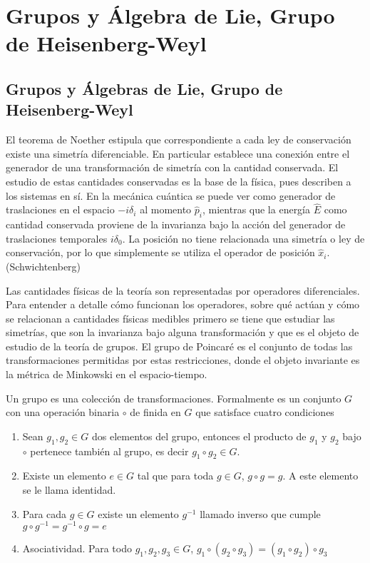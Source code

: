 \chapter{Grupos y \'Algebra de Lie, Grupo de Heisenberg-Weyl}
\section{Grupos y Álgebras de Lie, Grupo de Heisenberg-Weyl}

El teorema de Noether estipula que correspondiente a cada ley de conservación existe una simetría diferenciable. En particular establece una conexión entre el generador de una transformación de simetría con la cantidad conservada. El estudio de estas cantidades conservadas es la base de la física, pues describen a los sistemas en sí. En la mecánica cuántica se puede ver como generador de traslaciones en el espacio $-i\delta_i$ al momento $\hat{p}_i$, mientras que la energía $\hat{E}$ como cantidad conservada proviene de la invarianza bajo la acción del generador de traslaciones temporales $i\delta_0$. La posición no tiene relacionada una simetría o ley de conservación, por lo que simplemente se utiliza el operador de posición $\hat{x}_i$. (Schwichtenberg)

Las cantidades físicas de la teoría son representadas por operadores diferenciales. Para entender a detalle cómo funcionan los operadores, sobre qué actúan y cómo se relacionan a cantidades físicas medibles primero se tiene que estudiar las simetrías, que son la invarianza bajo alguna transformación y que es el objeto de estudio de la teoría de grupos. El grupo de Poincaré es el conjunto de todas las transformaciones permitidas por estas restricciones, donde el objeto invariante es la métrica de Minkowski en el espacio-tiempo.

Un grupo es una colección de transformaciones. Formalmente es un conjunto $G$ con una operación binaria $\circ$ de finida en $G$ que satisface cuatro condiciones
\begin{enumerate}
  \item Sean $g_1,g_2 \in G$ dos elementos del grupo, entonces el producto de $g_1$ y $g_2$ bajo $\circ$ pertenece también al grupo, es decir $g_1 \circ g_2 \in G$.
  \item Existe un elemento $e\in G$ tal que para toda $g\in G$, $g\circ g = g$. A este elemento se le llama identidad.
  \item Para cada $g\in G$ existe un elemento $g^{-1}$ llamado inverso que cumple $g\circ g^{-1} = g^{-1}\circ g =e$
  \item Asociatividad. Para todo $g_1, g_2, g_3 \in G$, $g_1 \circ (g_2 \circ g_3) = (g_1 \circ g_2) \circ g_3$
\end{enumerate}

